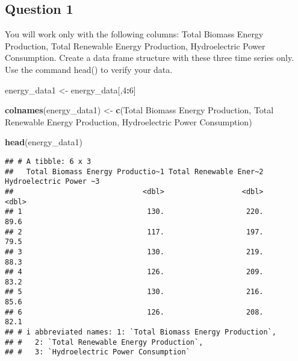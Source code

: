 \documentclass[
]{article}
\newenvironment{Shaded}{\begin{snugshade}}{\end{snugshade}}
\newcommand{\DecValTok}[1]{\textcolor[rgb]{0.00,0.00,0.81}{#1}}
\newcommand{\FunctionTok}[1]{\textcolor[rgb]{0.13,0.29,0.53}{\textbf{#1}}}
\newcommand{\NormalTok}[1]{#1}
\newcommand{\OtherTok}[1]{\textcolor[rgb]{0.56,0.35,0.01}{#1}}
\newcommand{\SpecialCharTok}[1]{\textcolor[rgb]{0.81,0.36,0.00}{\textbf{#1}}}
\newcommand{\StringTok}[1]{\textcolor[rgb]{0.31,0.60,0.02}{#1}}
\begin{document}
\hypertarget{question-1}{%
\subsection{Question 1}\label{question-1}}

You will work only with the following columns: Total Biomass Energy
Production, Total Renewable Energy Production, Hydroelectric Power
Consumption. Create a data frame structure with these three time series
only. Use the command head() to verify your data.

\begin{Shaded}
\begin{Highlighting}[]
\NormalTok{energy\_data1 }\OtherTok{\textless{}{-}}\NormalTok{ energy\_data[,}\DecValTok{4}\SpecialCharTok{:}\DecValTok{6}\NormalTok{]}
\end{Highlighting}
\end{Shaded}

\begin{Shaded}
\begin{Highlighting}[]
\FunctionTok{colnames}\NormalTok{(energy\_data1) }\OtherTok{\textless{}{-}} \FunctionTok{c}\NormalTok{(}\StringTok{\textquotesingle{}Total Biomass Energy Production\textquotesingle{}}\NormalTok{, }\StringTok{\textquotesingle{}Total Renewable Energy Production\textquotesingle{}}\NormalTok{, }\StringTok{\textquotesingle{}Hydroelectric Power Consumption\textquotesingle{}}\NormalTok{)}

\FunctionTok{head}\NormalTok{(energy\_data1)}
\end{Highlighting}
\end{Shaded}

\begin{verbatim}
## # A tibble: 6 x 3
##   Total Biomass Energy Productio~1 Total Renewable Ener~2 Hydroelectric Power ~3
##                              <dbl>                  <dbl>                  <dbl>
## 1                             130.                   220.                   89.6
## 2                             117.                   197.                   79.5
## 3                             130.                   219.                   88.3
## 4                             126.                   209.                   83.2
## 5                             130.                   216.                   85.6
## 6                             126.                   208.                   82.1
## # i abbreviated names: 1: `Total Biomass Energy Production`,
## #   2: `Total Renewable Energy Production`,
## #   3: `Hydroelectric Power Consumption`
\end{verbatim}
\end{document}
